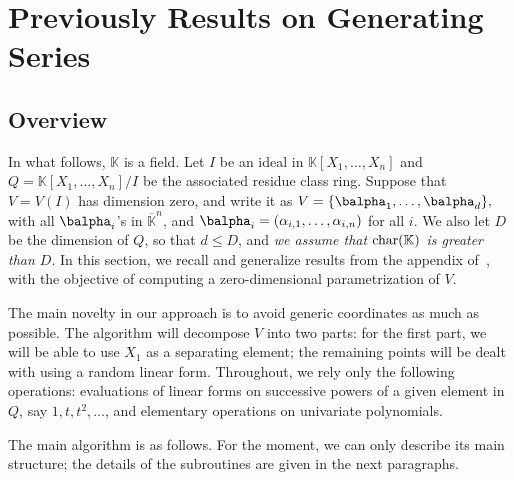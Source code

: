 \documentclass[12pt]{article}
\def\K {\ensuremath{\mathbb{K}}}
\def\Kbar {{\ensuremath{\overline{\mathbb{K}}}}}
\def\D {\ensuremath{D}}
\def\K{\mathbb{K}}
\begin{document}
\newpage
\section{Previously Results on Generating Series}

\subsection{Overview}
In what follows, $\K$ is a field.  Let $I$ be an ideal in
$\K[X_1,\dots,X_n]$ and $Q=\K[X_1,\dots,X_n]/I$ be the associated
residue class ring. Suppose that $V=V(I)$ has dimension zero, and
write it as $V=\{\balpha_1,\dots,\balpha_d\},$ with all $\balpha_i$'s
in $\Kbar^n$, and $\balpha_i=(\alpha_{i,1},\dots,\alpha_{i,n})$ for
all $i$.  We also let $\D$ be the dimension of $Q$, so that $d \le
\D$, and {\em we assume that ${\rm char}(\K)$ is greater than $D$}. In
this section, we recall and generalize results from the appendix
of~\cite{BoSaSc03}, with the objective of computing a zero-dimensional
parametrization of $V$.

The main novelty in our approach is to avoid generic coordinates as
much as possible. The algorithm will decompose $V$ into two parts: for
the first part, we will be able to use $X_1$ as a separating element;
the remaining points will be dealt with using a random linear
form. Throughout, we rely only the following operations: evaluations
of linear forms on successive powers of a given element in $Q$, say
$1,t,t^2,\dots$, and elementary operations on univariate polynomials.

The main algorithm is as follows. For the moment, we can only describe
its main structure; the details of the subroutines are given in the
next paragraphs.
\end{document}
